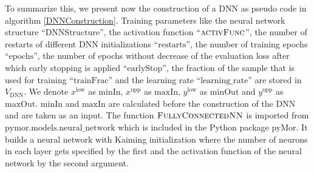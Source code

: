 To summarize this, we present now the construction of a DNN as pseudo code in algorithm \ref{DNNConstruction}. Training parameters like the neural network structure ``$\mathrm{DNNStructure}$'', the activation function ``$\textproc{activFunc}$'', the number of restarts of different DNN initializations ``$\mathrm{restarts}$'', the number of training epochs ``$\mathrm{epochs}$'', the number of epochs without decrease of the evaluation loss after which early stopping is applied ``$\mathrm{earlyStop}$'', the fraction of the sample that is used for training ``$\mathrm{trainFrac}$'' and the learning rate ``$\mathrm{learning\_rate}$'' are stored in $V_\mathrm{DNN}$. We denote $x^\mathrm{low}$ as $\mathrm{minIn}$, $x^\mathrm{upp}$ as $\mathrm{maxIn}$, $y^\mathrm{low}$ as $\mathrm{minOut}$ and $y^\mathrm{upp}$ as $\mathrm{maxOut}$. $\mathrm{minIn}$ and $\mathrm{maxIn}$ are calculated before the construction of the DNN and are taken as an input. The function $\textproc{FullyConnectedNN}$ is imported from $\mathrm{pymor.models.neural\_network}$ which is included in the Python package pyMor. It builds a neural network with Kaiming initialization where the number of neurons in each layer gets specified by the first and the activation function of the neural network by the second argument.

